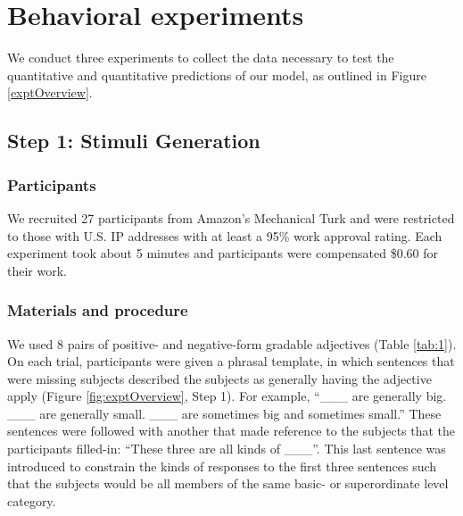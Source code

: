\documentclass[doc]{apa6}
\begin{document}

\section{Behavioral experiments}

We conduct three experiments to collect the data necessary to test the quantitative and quantitative predictions of our model, as outlined in Figure \ref{exptOverview}. 

\subsection{Step 1: Stimuli Generation}

\subsubsection{Participants}

We recruited 27 participants from Amazon's Mechanical
Turk and were restricted to those with U.S. IP addresses with at least a
95\% work approval rating. Each experiment took about 5 minutes and
participants were compensated \$0.60 for their work.

\subsubsection{Materials and procedure}

We used 8 pairs of positive- and negative-form gradable adjectives (Table \ref{tab:1}).
On each trial, participants were given a phrasal template, in which sentences that were missing subjects described the subjects as generally having the adjective apply (Figure \ref{fig:exptOverview}, Step 1). 
For example, ``\_\_\_ are generally big. \_\_\_ are generally small. \_\_\_ are sometimes big and sometimes small.'' These sentences were followed with another that made reference to the subjects that the participants filled-in: ``These three are all kinds of \_\_\_''. This last sentence was introduced to constrain the kinds of responses to the first three sentences such that the subjects would be all members of the same basic- or superordinate level category. 
\end{document}
